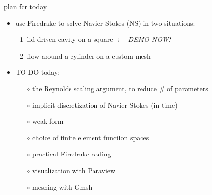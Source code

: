 \documentclass[10pt,hyperref]{beamer}
\begin{document}
\begin{frame}{plan for today}

\begin{itemize}
\item use Firedrake to solve Navier-Stokes (NS) in two situations:
    \begin{enumerate}
    \item lid-driven cavity on a square \hfill \alert{$\leftarrow$ \emph{DEMO NOW!}}
    \item flow around a cylinder on a custom mesh
    \end{enumerate}

\bigskip
\item TO DO today:
    \begin{itemize}
    \item[$\circ$] the Reynolds scaling argument, to reduce \# of parameters
    \item[$\circ$] implicit discretization of Navier-Stokes (in time)
    \item[$\circ$] weak form
    \item[$\circ$] choice of finite element function spaces
    \item[$\circ$] practical Firedrake coding
    \item[$\circ$] visualization with Paraview
    \item[$\circ$] meshing with Gmsh
    \end{itemize}
\end{itemize}
\end{frame}
\end{document}
